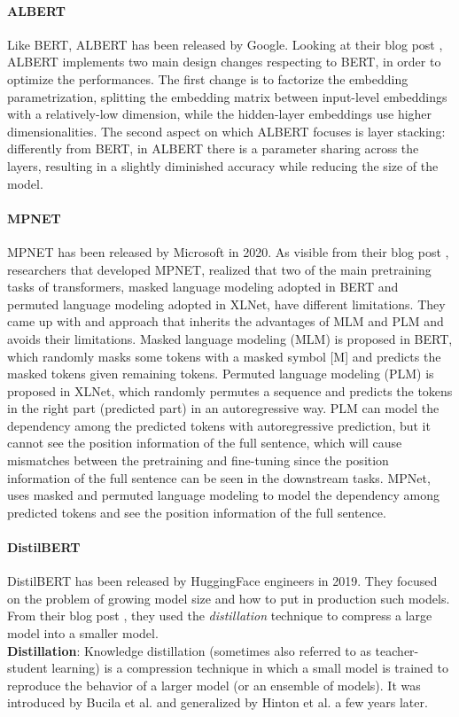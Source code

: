 \documentclass[\main/main.tex]{subfiles}
\begin{document}
\paragraph{ALBERT}
Like BERT, ALBERT has been released by Google. Looking at their blog post \cite{albert_blog_post}, ALBERT implements two main design changes respecting to BERT, in order to optimize the performances. The first change is to factorize the embedding parametrization, splitting the embedding matrix between input-level embeddings with a relatively-low dimension, while the hidden-layer embeddings use higher dimensionalities. The second aspect on which ALBERT focuses is layer stacking: differently from BERT, in ALBERT there is a parameter sharing across the layers, resulting in a slightly diminished accuracy while reducing the size of the model. \cite{DBLP:journals/corr/abs-1909-11942}
\paragraph{MPNET}
MPNET has been released by Microsoft in 2020. As visible from their blog post \cite{mpnet_blog_post},  researchers that developed MPNET, realized that two of the main pretraining tasks of transformers, masked language modeling adopted in BERT and permuted language modeling adopted in XLNet, have different limitations. They came up with and approach that inherits the advantages of MLM and PLM and avoids their limitations. Masked language modeling (MLM) is proposed in BERT, which randomly masks some tokens with a masked symbol [M] and predicts the masked tokens given remaining tokens. Permuted language modeling (PLM) is proposed in XLNet, which randomly permutes a sequence and predicts the tokens in the right part (predicted part) in an autoregressive way. PLM can model the dependency among the predicted tokens with autoregressive prediction, but it cannot see the position information of the full sentence, which will cause mismatches between the pretraining and fine-tuning since the position information of the full sentence can be seen in the downstream tasks. MPNet, uses masked and permuted language modeling to model the dependency among predicted tokens and see the position information of the full sentence. 
\cite{DBLP:journals/corr/abs-2004-09297}
\paragraph{DistilBERT}
DistilBERT has been released by HuggingFace engineers in 2019. They focused on the problem of growing model size and how to put in production such models. From their blog post \cite{distilbert_blog_post}, they used the \textit{distillation} technique to compress a large model into a smaller model.\\
\textbf{Distillation}: Knowledge distillation (sometimes also referred to as teacher-student learning) is a compression technique in which a small model is trained to reproduce the behavior of a larger model (or an ensemble of models). It was introduced by Bucila et al.\cite{10.1145/1150402.1150464} and generalized by Hinton et al.\cite{hinton2015distilling} a few years later. 
\cite{DBLP:journals/corr/abs-1910-01108}
\end{document}
